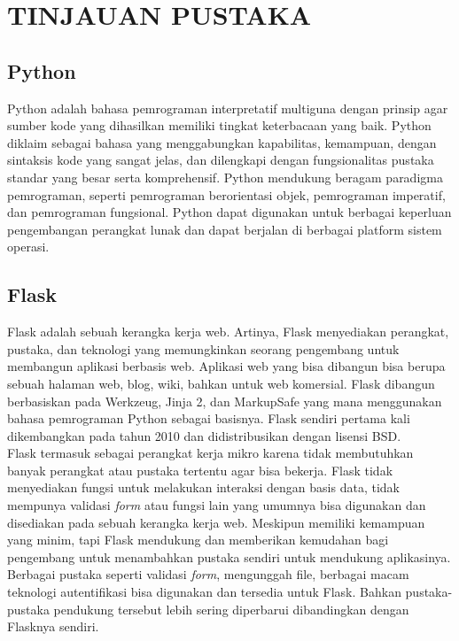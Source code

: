 \chapter{TINJAUAN PUSTAKA}
\section{Python}
Python adalah bahasa pemrograman interpretatif multiguna dengan prinsip agar sumber kode yang dihasilkan memiliki tingkat keterbacaan yang baik. Python diklaim sebagai bahasa yang menggabungkan kapabilitas, kemampuan, dengan sintaksis kode yang sangat jelas, dan dilengkapi dengan fungsionalitas pustaka standar yang besar serta komprehensif. Python mendukung beragam paradigma pemrograman, seperti pemrograman berorientasi objek, pemrograman imperatif, dan pemrograman fungsional. Python dapat digunakan untuk berbagai keperluan pengembangan perangkat lunak dan dapat berjalan di berbagai platform sistem operasi. \cite{bab2-python} \\

\section{Flask}
Flask adalah sebuah kerangka kerja web. Artinya, Flask menyediakan perangkat, pustaka, dan teknologi yang memungkinkan seorang pengembang untuk membangun aplikasi berbasis web. Aplikasi web yang bisa dibangun bisa berupa sebuah halaman web, blog, wiki, bahkan untuk web komersial. Flask dibangun berbasiskan pada Werkzeug, Jinja 2, dan MarkupSafe yang mana menggunakan bahasa pemrograman Python sebagai basisnya. Flask sendiri pertama kali dikembangkan pada tahun 2010 dan didistribusikan dengan lisensi BSD. \cite{bab2-flask} \\
\indent Flask termasuk sebagai perangkat kerja mikro karena tidak membutuhkan banyak perangkat atau pustaka tertentu agar bisa bekerja. Flask tidak menyediakan fungsi untuk melakukan interaksi dengan basis data, tidak mempunya validasi \textit{form} atau fungsi lain yang umumnya bisa digunakan dan disediakan pada sebuah kerangka kerja web. Meskipun memiliki kemampuan yang minim, tapi Flask mendukung dan memberikan kemudahan bagi pengembang untuk menambahkan pustaka sendiri untuk mendukung aplikasinya. Berbagai pustaka seperti validasi \textit{form}, mengunggah file, berbagai macam teknologi autentifikasi bisa digunakan dan tersedia untuk Flask. Bahkan pustaka-pustaka pendukung tersebut lebih sering diperbarui dibandingkan dengan Flasknya sendiri.

